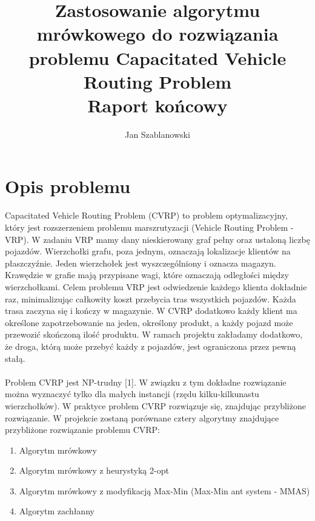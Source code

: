 \documentclass{article}
\title{Zastosowanie algorytmu mrówkowego do rozwiązania problemu Capacitated Vehicle Routing Problem \\ \large{Raport końcowy}}
\author{Jan Szablanowski}
\begin{document}
\date{}
\maketitle

\vspace{2cm}
\hypersetup{
    linkcolor=black,
    citecolor=black,
    urlcolor=black
}

\abstract{}


\tableofcontents
\newpage



\section{Opis problemu}

Capacitated Vehicle Routing Problem (CVRP) to problem optymalizacyjny, który jest rozszerzeniem problemu marszrutyzacji (Vehicle Routing Problem - VRP). W zadaniu VRP mamy dany nieskierowany graf pełny oraz ustaloną liczbę pojazdów. Wierzchołki grafu, poza jednym, oznaczają lokalizacje klientów na płaszczyźnie. Jeden wierzchołek jest wyszczególniony i oznacza magazyn. Krawędzie w grafie mają przypisane wagi, które oznaczają odległości między wierzchołkami. Celem problemu VRP jest odwiedzenie każdego klienta dokładnie raz, minimalizując całkowity koszt przebycia tras wszystkich pojazdów. Każda trasa zaczyna się i kończy w magazynie. W CVRP dodatkowo każdy klient ma określone zapotrzebowanie na jeden, określony produkt, a każdy pojazd może przewozić skończoną ilość produktu. W ramach projektu zakładamy dodatkowo, że droga, którą może przebyć każdy z pojazdów, jest ograniczona przez pewną stałą.
\\ \\
Problem CVRP jest NP-trudny [1]. W związku z tym dokładne rozwiązanie można wyznaczyć tylko dla małych instancji (rzędu kilku-kilkunastu wierzchołków). W praktyce problem CVRP rozwiązuje się, znajdując przybliżone rozwiązanie. W projekcie zostaną porównane cztery algorytmy znajdujące przybliżone rozwiązanie problemu CVRP:
\begin{enumerate}
    \item Algorytm mrówkowy
    \item Algorytm mrówkowy z heurystyką 2-opt
    \item Algorytm mrówkowy z modyfikacją Max-Min (Max-Min ant system - MMAS)
    \item Algorytm zachłanny
\end{enumerate}
\end{document}
